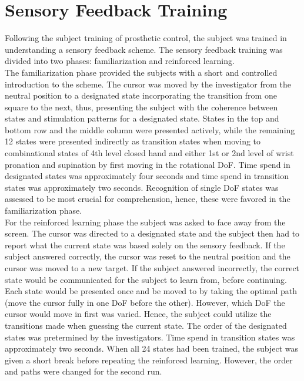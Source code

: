 \section{Sensory Feedback Training}

Following the subject training of prosthetic control, the subject was trained in understanding a sensory feedback scheme. The sensory feedback training was divided into two phases: familiarization and reinforced learning. \\
The familiarization phase provided the subjects with a short and controlled introduction to the scheme. The cursor was moved by the investigator from the neutral position to a designated state incorporating the transition from one square to the next, thus, presenting the subject with the coherence between states and stimulation patterns for a designated state. States in the top and bottom row and the middle column were presented actively, while the remaining 12 states were presented indirectly as transition states when moving to combinational states of 4th level closed hand and either 1st or 2nd level of wrist pronation and supination by first moving in the rotational DoF. Time spend in designated states was approximately four seconds and time spend in transition states was approximately two seconds. Recognition of single DoF states was assessed to be most crucial for comprehension, hence, these were favored in the familiarization phase. \\
For the reinforced learning phase the subject was asked to face away from the screen. The cursor was directed to a designated state and the subject then had to report what the current state was based solely on the sensory feedback. If the subject answered correctly, the cursor was reset to the neutral position and the cursor was moved to a new target. If the subject answered incorrectly, the correct state would be communicated for the subject to learn from, before continuing. Each state would be presented once and be moved to by taking the optimal path (move the cursor fully in one DoF before the other). However, which DoF the cursor would move in first was varied. Hence, the subject could utilize the transitions made when guessing the current state. The order of the designated states was pretermined by the investigators. Time spend in transition states was approximately two seconds. When all 24 states had been trained, the subject was given a short break before repeating the reinforced learning. However, the order and paths were changed for the second run.